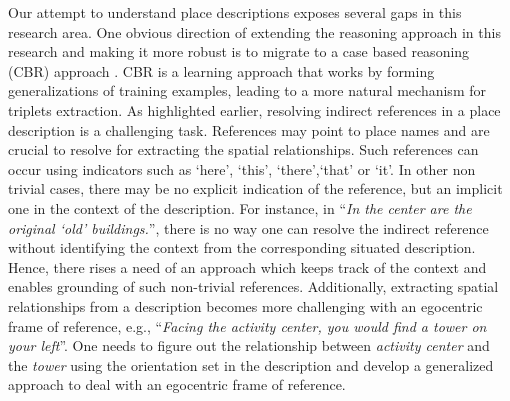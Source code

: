 \documentclass{acm_proc_article-sp}
\begin{document}
Our attempt to understand place descriptions exposes several gaps in this research area. One obvious direction of extending the reasoning approach in this research and making it more robust is to migrate to a case based reasoning (CBR) approach \cite{xu:case}. CBR is a learning approach that works by forming generalizations of training examples, leading to a more natural mechanism for triplets extraction. As highlighted earlier, resolving indirect references in a place description is a challenging task. References may point to place names and are crucial to resolve for extracting the spatial relationships. Such references can occur using indicators such as `here', `this', `there',`that' or `it'. In other non trivial cases, there may be no explicit indication of the reference, but an implicit one in the context of the description. For instance, in ``\textit{In the center are the original `old' buildings.}'', there is no way one can resolve the indirect reference without identifying the context from the corresponding situated description. Hence, there rises a need of an approach which keeps track of the context and enables grounding of such non-trivial references. Additionally, extracting spatial relationships from a description becomes more challenging with an egocentric frame of reference, e.g., ``\textit{Facing the activity center, you would find a tower on your left}''. One needs to figure out the relationship between \textit{activity center} and the \textit{tower} using the orientation set in the description and develop a generalized approach to deal with an egocentric frame of reference.


%
%
\end{document}
